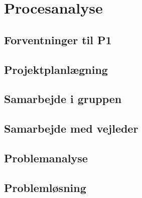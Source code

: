 \chapter*{Procesanalyse}



\section*{Forventninger til P1}


\section*{Projektplanlægning}


\clearpage
\section*{Samarbejde i gruppen}


\clearpage
\section*{Samarbejde med vejleder}


\clearpage
\section*{Problemanalyse}


\clearpage
\section*{Problemløsning}
